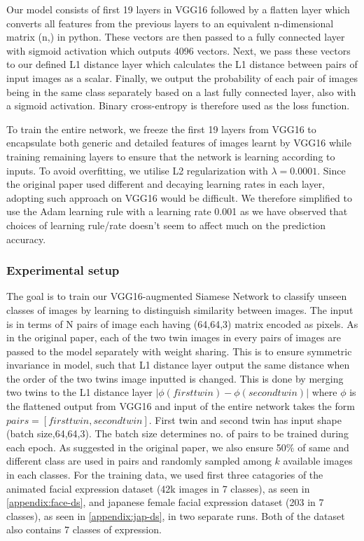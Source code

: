 \documentclass{article}
\begin{document}
Our model consists of first 19 layers in VGG16 followed by a flatten layer which converts all features from the previous layers to
an equivalent n-dimensional matrix (n,) in python. These vectors are then passed to a fully connected layer with sigmoid activation which outputs 4096 vectors. Next, we pass these vectors to our defined L1 distance layer which calculates the L1 distance between pairs of input images as a scalar. Finally, we output the probability of each pair of images being in the same class separately based on a last fully connected layer, also with a sigmoid activation. Binary cross-entropy is therefore used as the loss function.

To train the entire network, we freeze the first 19 layers from VGG16 to encapsulate both generic and detailed features of images learnt by VGG16 while training remaining layers to ensure that the network is learning according to inputs. To avoid overfitting, we utilise L2 regularization with $\lambda=0.0001$. Since the original paper used different and decaying learning rates in each layer, adopting such approach on VGG16 would be difficult. We therefore simplified to use the Adam learning rule with a learning rate 0.001 as we have observed that choices of learning rule/rate doesn't seem to affect much on the prediction accuracy.

\subsubsection{\textbf{Experimental setup}}

The goal is to train our VGG16-augmented Siamese Network to classify unseen classes of images by learning to distinguish similarity between images. The input is in terms of N pairs of image each having (64,64,3) matrix encoded as pixels. As in the original paper, each of the two twin images in every pairs of images are passed to the model separately with weight sharing. This is to ensure symmetric invariance in model, such that L1 distance layer output the same distance when the order of the two twins image inputted is changed. This is done by merging two twins to the L1 distance layer $|\phi(first twin) - \phi(second twin)|$ where $\phi$ is the flattened output from VGG16 and input of the entire network takes the form $pairs = [first twin,second twin]$. First twin and second twin has input shape (batch size,64,64,3). The batch size determines no. of pairs to be trained during each epoch. As suggested in the original paper, we also ensure 50$\%$ of same and different class are used in pairs and randomly sampled among $k$ available images in each classes. For the training data, we used first three catagories of the animated facial expression dataset (42k images in 7 classes), as seen in \ref{appendix:face-ds}, and japanese female facial expression dataset (203 in 7 classes), as seen in \ref{appendix:jap-ds}, in two separate runs. Both of the dataset also contains 7 classes of expression.
\end{document}
